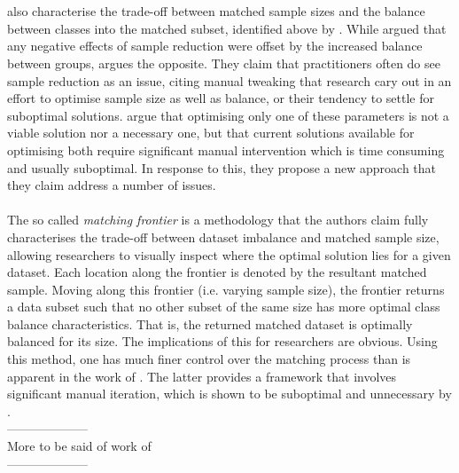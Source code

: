 {\\\\
\cite{king2014balance} also characterise the trade-off between matched sample sizes and the balance between classes into the matched subset, identified above by \cite{stuart2010matching}. While \cite{stuart2010matching} argued that any negative effects of sample reduction were offset by the increased balance between groups, \cite{king2014balance} argues the opposite. They claim that practitioners often do see sample reduction as an issue, citing manual tweaking that research cary out in an effort to optimise sample size as well as balance, or their tendency to settle for suboptimal solutions. \cite{king2014balance} argue that optimising only one of these parameters is not a viable solution nor a necessary one, but that current solutions available for optimising both require significant manual intervention which is time consuming and usually suboptimal. In response to this, they propose a new approach that they claim address a number of issues. \\\\
The so called {\it matching frontier} is a methodology that the authors claim fully characterises the trade-off between dataset imbalance and matched sample size, allowing researchers to visually inspect where the optimal solution lies for a given dataset. Each location along the frontier is denoted by the resultant matched sample. Moving along this frontier (i.e. varying sample size), the frontier returns a data subset such that no other subset of the same size has more optimal class balance characteristics. That is, the returned matched dataset is optimally balanced for its size. The implications of this for researchers are obvious. Using this method, one has much finer control over the matching process than is apparent in the work of  \cite{stuart2010matching}. The latter provides a framework that involves significant manual iteration, which is shown to be suboptimal and unnecessary by \cite{king2014balance}.\\
--------------------\\
{\color{red}
More to be said of work of \cite{king2014balance}\\}
--------------------}
